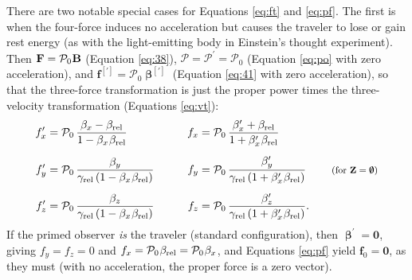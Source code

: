 \documentclass[12pt]{article}
\renewcommand{\vv}[1]{\mathbf{#1}}
\newcommand{\vvbeta}{\bm{\upbeta}}
\begin{document}
There are two notable special cases for Equations \ref{eq:ft} and \ref{eq:pf}. The first is when the four-force induces no acceleration but causes the traveler to lose or gain rest energy (as with the light-emitting body in Einstein's thought experiment). Then $\vv F = \mathcal{P}_0 \mkern.5mu \vv B$ (Equation \ref{eq:38}), $\mathcal{P} = \mathcal{P}^\prime = \mathcal{P}_0$ (Equation \ref{eq:po} with zero acceleration), and $\vv f^{[\prime]} = \mathcal{P}_0 \vvbeta^{[\prime]}$ (Equation \ref{eq:41} with zero acceleration), so that the three-force transformation is just the proper power times the three-velocity transformation (Equations \ref{eq:vt}):
\begin{equation*}
\begin{aligned}
f_x^{\prime} &= \mathcal{P}_0 \, \frac{\beta_x - \beta_{\textrm{rel}}}{1 - \beta_{x} \mkern1mu \beta_{\textrm{rel}}} & f_x &= \mathcal{P}_0 \, \frac{\beta_x^{\prime} + \beta_{\textrm{rel}}}{1 + \beta_x^{\prime} \mkern1mu \beta_{\textrm{rel}}}\\[5pt]
f_y^{\prime} &= \mathcal{P}_0 \, \frac{\beta_y}{\gamma_{\textrm{rel}} \left( 1 - \beta_{x} \mkern1mu \beta_{\textrm{rel}} \right)}& \qquad f_y &= \mathcal{P}_0 \, \frac{\beta_y^{\prime}}{\gamma_{\textrm{rel}} \left( 1 + \beta_x^{\prime} \mkern1mu \beta_{\textrm{rel}} \right) } \qquad \textrm{\footnotesize{ (for $\vv Z = \textrm{\mbox{\boldmath $\emptyset$}}$)}}\\[5pt]
f_z^{\prime} &= \mathcal{P}_0 \, \frac{\beta_z}{\gamma_{\textrm{rel}} \left( 1 - \beta_{x} \mkern1mu \beta_{\textrm{rel}} \right)}& f_z &= \mathcal{P}_0 \, \frac{\beta_z^{\prime}}{\gamma_{\textrm{rel}} \left( 1 + \beta_x^{\prime} \mkern1mu \beta_{\textrm{rel}} \right)}.
\end{aligned}
\end{equation*}
If the primed observer \emph{is} the traveler (standard configuration), then $\vvbeta^\prime = \vv 0$, giving $f_y = f_z = 0$ and $f_x = \mathcal{P}_0 \mkern1mu \beta_{\mathrm{rel}} = \mathcal{P}_0 \mkern1mu \beta_x$, and Equations \ref{eq:pf} yield $\vv f_0 = \vv 0$, as they must (with no acceleration, the proper force is a zero vector).
\end{document}
